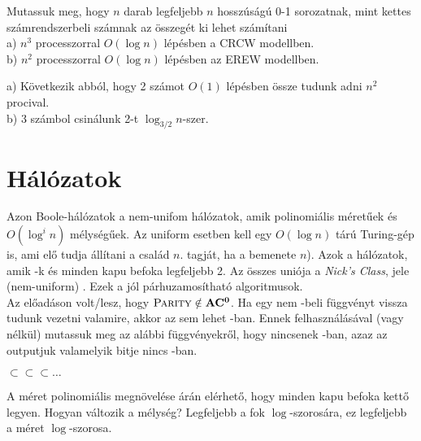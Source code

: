 \begin{Exercise}[counter={sorszam}, difficulty=0]
	Mutassuk meg, hogy $n$ darab legfeljebb $n$ hosszúságú 0-1 sorozatnak, mint kettes számrendszerbeli számnak az összegét ki lehet számítani\\
	a) $n^3$ processzorral $O(\log n)$ lépésben a CRCW modellben.\\
	b) $n^2$ processzorral $O(\log n)$ lépésben az EREW modellben.
\end{Exercise}	
\begin{Answer}
	a) K\"ovetkezik abb\'ol, hogy 2 sz\'amot $O(1)$ l\'ep\'esben \"ossze tudunk adni $n^2$ procival.\\
	b) 3 sz\'ambol csin\'alunk 2-t $\log_{3/2} n$-szer.
\end{Answer}








\chapter{H\'al\'ozatok}

 Azon Boole-hálózatok a nem-unifom  hálózatok, amik polinomiális méret\H uek \'es $O(\log^i n)$ mélység\H uek.
Az uniform esetben kell egy $O(\log n)$ t\'ar\'u Turing-g\'ep is, ami el\H o tudja \'all\'itani a csal\'ad $n$. tagj\'at, ha a bemenete $n$).
Azok a  hálózatok, amik -k és minden kapu befoka legfeljebb 2.
Az \"osszes uni\'oja a {\it Nick's Class}, jele (nem-uniform) .
Ezek a j\'ol p\'arhuzamos\'ithat\'o algoritmusok.\\
Az el\H oad\'ason volt/lesz, hogy $\mbox{\sc{Parity}}\notin\mbox{\ensuremath{\mathbf{AC^0}}}$.
Ha egy nem \ACnull-beli függvényt vissza tudunk vezetni valamire, akkor az sem lehet \ACnull-ban. Ennek felhasználásával (vagy n\'elk\"ul) mutassuk meg az alábbi függvényekr\H ol, hogy nincsenek \ACnull-ban, azaz az outputjuk valamelyik bitje nincs \ACnull-ban.

\begin{Exercise}[counter={sorszam}, difficulty=0]
	$\subset$$\subset$$\subset\ldots$
\end{Exercise}	
\begin{Answer}
	A méret polinomiális megnövelése árán elérhet\H o, hogy minden kapu befoka kett\H o legyen.
	Hogyan v\'altozik a m\'elys\'eg? Legfeljebb a fok $\log$-szoros\'ara, ez legfeljebb a m\'eret $\log$-szorosa.
\end{Answer}

